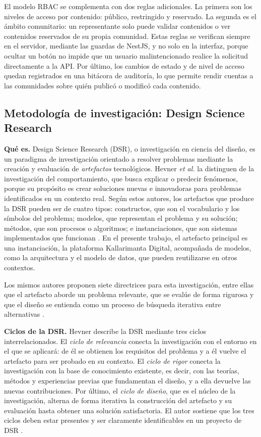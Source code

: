 El modelo RBAC se complementa con dos reglas adicionales. La primera son los niveles de acceso por contenido: público, restringido y reservado. La segunda es el ámbito comunitario: un representante solo puede validar contenidos o ver contenidos reservados de su propia comunidad. Estas reglas se verifican siempre en el servidor, mediante las guardas de NestJS, y no solo en la interfaz, porque ocultar un botón no impide que un usuario malintencionado realice la solicitud directamente a la API. Por último, los cambios de estado y de nivel de acceso quedan registrados en una bitácora de auditoría, lo que permite rendir cuentas a las comunidades sobre quién publicó o modificó cada contenido.

\subsection{Metodología de investigación: Design Science Research}
\textbf{Qué es.} Design Science Research (DSR), o investigación en ciencia del diseño, es un paradigma de investigación orientado a resolver problemas mediante la creación y evaluación de \textit{artefactos} tecnológicos. Hevner \textit{et al.} \cite{hevner2004design} la distinguen de la investigación del comportamiento, que busca explicar o predecir fenómenos, porque su propósito es crear soluciones nuevas e innovadoras para problemas identificados en un contexto real. Según estos autores, los artefactos que produce la DSR pueden ser de cuatro tipos: constructos, que son el vocabulario y los símbolos del problema; modelos, que representan el problema y su solución; métodos, que son procesos o algoritmos; e instanciaciones, que son sistemas implementados que funcionan \cite{hevner2004design}. En el presente trabajo, el artefacto principal es una instanciación, la plataforma Kallarimanta Digital, acompañada de modelos, como la arquitectura y el modelo de datos, que pueden reutilizarse en otros contextos.

Los mismos autores proponen siete directrices para esta investigación, entre ellas que el artefacto aborde un problema relevante, que se evalúe de forma rigurosa y que el diseño se entienda como un proceso de búsqueda iterativa entre alternativas \cite{hevner2004design}.

\textbf{Ciclos de la DSR.} Hevner \cite{hevner2007three} describe la DSR mediante tres ciclos interrelacionados. El \textit{ciclo de relevancia} conecta la investigación con el entorno en el que se aplicará: de él se obtienen los requisitos del problema y a él vuelve el artefacto para ser probado en su contexto. El \textit{ciclo de rigor} conecta la investigación con la base de conocimiento existente, es decir, con las teorías, métodos y experiencias previas que fundamentan el diseño, y a ella devuelve las nuevas contribuciones. Por último, el \textit{ciclo de diseño}, que es el núcleo de la investigación, alterna de forma iterativa la construcción del artefacto y su evaluación hasta obtener una solución satisfactoria. El autor sostiene que los tres ciclos deben estar presentes y ser claramente identificables en un proyecto de DSR \cite{hevner2007three}.

